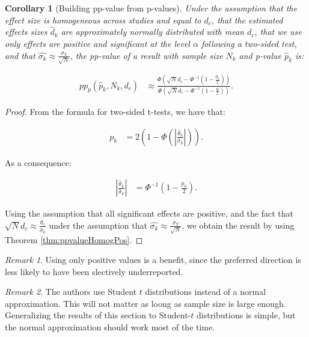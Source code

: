 \documentclass[
]{book}
\newtheorem{corollary}{Corollary}[chapter]
\theoremstyle{definition}
\theoremstyle{definition}
\theoremstyle{definition}
\theoremstyle{definition}
\theoremstyle{remark}
\newtheorem*{remark}{Remark}
\begin{document}
\begin{corollary}[Building pp-value from p-values]
\protect\hypertarget{cor:pppvalueHomogPos}{}{\label{cor:pppvalueHomogPos} \iffalse (Building pp-value from p-values) \fi{} }Under the assumption that the effect size is homogeneous across studies and equal to \(d_c\), that the estimated effects sizes \(\hat{d}_k\) are approximately normally distributed with mean \(d_c\), that we use only effects are positive and significant at the level \(\alpha\) following a two-sided test, and that \(\hat{\sigma_k}\approx\frac{\sigma_{Y}}{\sqrt{N}}\), the pp-value of a result with sample size \(N_k\) and p-value \(\hat{p}_k\) is:

\begin{align*}
  pp_p(\hat{p}_k,N_k,d_c) & \approx \frac{\Phi\left(\sqrt{N}d_c-\Phi^{-1}\left(1-\frac{p_k}{2}\right)\right)}
                                        {\Phi\left(\sqrt{N}d_c-\Phi^{-1}\left(1-\frac{\alpha}{2}\right)\right)}.
 \end{align*}
\end{corollary}

\begin{proof}
\iffalse{} {Proof. } \fi{}From the formula for two-sided t-tests, we have that:

\begin{align*}
  p_k & = 2\left(1-\Phi\left(\left|\frac{\hat{\theta}_k}{\hat{\sigma}_k}\right|\right)\right).
\end{align*}

As a consequence:

\begin{align*}
  \left|\frac{\hat{\theta}_k}{\hat{\sigma}_k}\right| & = \Phi^{-1}\left(1-\frac{p_k}{2}\right).
\end{align*}

Using the assumption that all significant effects are positive, and the fact that \(\sqrt{N}d_c\approx\frac{\theta_c}{\hat{\sigma}_k}\) under the assumption that \(\hat{\sigma_k}\approx\frac{\sigma_{Y}}{\sqrt{N}}\), we obtain the result by using Theorem \ref{thm:ppvalueHomogPos}.
\end{proof}

\begin{remark}
\iffalse{} {Remark. } \fi{}Using only positive values is a benefit, since the preferred direction is less likely to have been slectively underreported.
\end{remark}

\begin{remark}
\iffalse{} {Remark. } \fi{}The authors use Student \(t\) distributions instead of a normal approximation.
This will not matter as loong as sample size is large enough.
Generalizing the results of this section to Student-\(t\) distributions is simple, but the normal approximation should work most of the time.
\end{remark}
\end{document}
